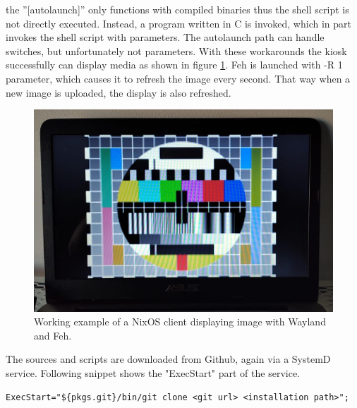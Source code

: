 the ''[autolaunch]'' only functions with compiled binaries thus the shell script is not directly executed. Instead, a program written in C is invoked, which in part invokes the shell script with parameters. The autolaunch path can handle switches, but unfortunately not parameters. With these workarounds the kiosk successfully can display media as shown in figure \ref{testimage}. Feh is launched with -R 1 parameter, which causes it to refresh the image every second. That way when a new image is uploaded, the display is also refreshed.

\begin{figure}
    \centering
    \includegraphics[scale=0.2]{latex/kuvat/testimage.jpeg}
    \caption{Working example of a NixOS client displaying image with Wayland and Feh.}
    \label{testimage}
\end{figure}

The sources and scripts are downloaded from Github, again via a SystemD service. Following snippet shows the "ExecStart" part of the service.

\begin{lstlisting}
ExecStart="${pkgs.git}/bin/git clone <git url> <installation path>";
\end{lstlisting}


